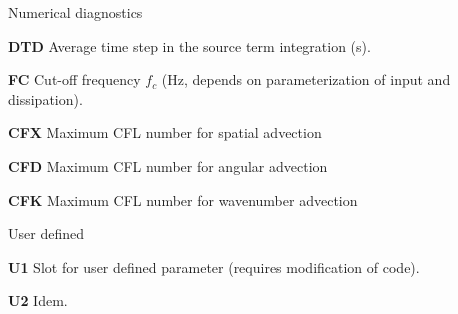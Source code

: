 \begin{list}{)\hfill}
\item{Numerical diagnostics }

\begin{list}{)\hfill}
            { \leftmargin 8mm 
             \rightmargin 0mm \itemsep 0mm \parsep 0mm}
\item \textbf{DTD} Average time step in the source term integration (s).
\item \textbf{FC} Cut-off frequency $f_c$ (Hz, depends on parameterization of
      input and dissipation).
\item \textbf{CFX} Maximum CFL number for spatial advection 
\item \textbf{CFD} Maximum CFL number for angular advection 
\item \textbf{CFK} Maximum CFL number for wavenumber advection 
\end{list}

\item{User defined }

\begin{list}{)\hfill}
            { \leftmargin 8mm 
             \rightmargin 0mm \itemsep 0mm \parsep 0mm}

\item \textbf{U1} Slot for user defined parameter (requires modification of code).
\item \textbf{U2} Idem.
\end{list}

\end{list}





